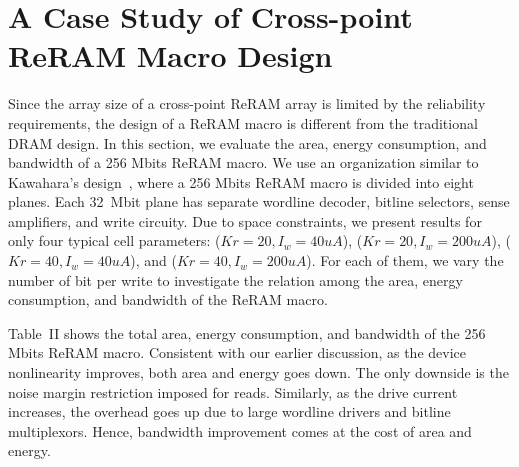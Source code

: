 \section{A Case Study of Cross-point ReRAM Macro Design}\label{sec:macro}
Since the array size of a cross-point ReRAM array is limited by
the reliability requirements, the design of a ReRAM macro is different
from the traditional DRAM design.
In this section, we evaluate the area, energy consumption, and bandwidth of a
256 Mbits ReRAM macro.
We use an organization similar to Kawahara's design~\cite{crossbar_Panasonic}, where
a 256 Mbits ReRAM macro is divided into
eight planes. Each 32~Mbit plane has separate wordline
decoder, bitline selectors, sense amplifiers, and write circuity. Due to
space constraints, we present results for only
four typical cell parameters: ($Kr=20,
I_w=40uA$), ($Kr=20, I_w=200uA$), ($Kr=40, I_w=40uA$), and ($Kr=40,
I_w=200uA$). For each of them, we vary the number of bit per write to
investigate the relation among the area, energy consumption, and bandwidth
of the ReRAM macro.


Table~II shows the total area, energy consumption, and bandwidth of the
256 Mbits ReRAM macro. Consistent with our earlier discussion,
as the device nonlinearity improves, both area and energy
goes down. The only downside is the noise margin restriction
imposed for reads. Similarly, as the drive current increases, the overhead
goes up due to large wordline drivers and bitline multiplexors.
Hence, bandwidth improvement comes at the cost of area
and energy.

